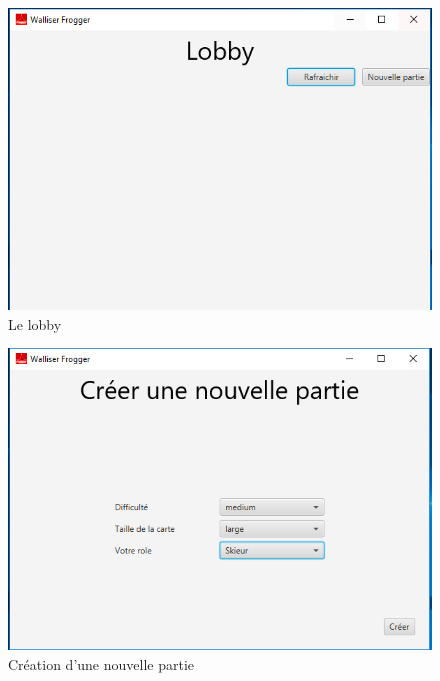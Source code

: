 \documentclass[a4paper,12pt]{article}
\begin{document}
	\begin{figure}[ht]
		\centering
		\includegraphics[width=\textwidth]{../Screenshots/lobby.PNG}
		\caption{Le lobby}
		\label{fig:lobby}
	\end{figure}
	
	\begin{figure}[ht]
		\centering
		\includegraphics[width=\textwidth]{../Screenshots/nouvelle_partie.PNG}
		\caption{Création d'une nouvelle partie}
		\label{fig:nouvellePartie}
	\end{figure}
	
\end{document}
